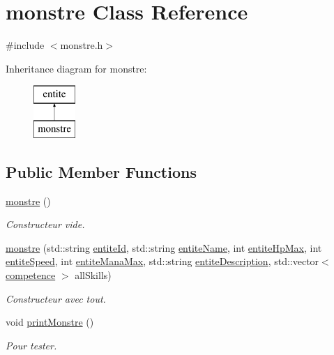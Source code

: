 \hypertarget{classmonstre}{}\section{monstre Class Reference}
\label{classmonstre}


{\ttfamily \#include $<$monstre.\+h$>$}

Inheritance diagram for monstre\+:\begin{figure}[H]
\begin{center}
\leavevmode
\includegraphics[height=2.000000cm]{classmonstre}
\end{center}
\end{figure}
\subsection*{Public Member Functions}
\begin{DoxyCompactItemize}
\item 
\hyperlink{classmonstre_a718cb1c5f9297f00e42e6b884ca85d6d}{monstre} ()
\begin{DoxyCompactList}\small\item\em Constructeur vide. \end{DoxyCompactList}\item 
\hyperlink{classmonstre_a863d9f9a553a2e3a49d16182dd004da8}{monstre} (std\+::string \hyperlink{classentite_a904e8783de9fe2fc4306bf6b7822d025}{entite\+Id}, std\+::string \hyperlink{classentite_abe631a515b1cd0866dcfb078c4ceb07a}{entite\+Name}, int \hyperlink{classentite_a754557f56c1c1fcbcbd40eec68b60f65}{entite\+Hp\+Max}, int \hyperlink{classentite_ad9df70a9bb07f07b3ebf520941c3a35f}{entite\+Speed}, int \hyperlink{classentite_a696167d32c27b3b2a2fa6b473a888b18}{entite\+Mana\+Max}, std\+::string \hyperlink{classentite_a6fab1d9a04ade2cb97ec0904b12c82c9}{entite\+Description}, std\+::vector$<$ \hyperlink{classcompetence}{competence} $>$ all\+Skills)
\begin{DoxyCompactList}\small\item\em Constructeur avec tout. \end{DoxyCompactList}\item 
void \hyperlink{classmonstre_aeb60395664bbca7846e037b058b5c716}{print\+Monstre} ()
\begin{DoxyCompactList}\small\item\em Pour tester. \end{DoxyCompactList}\end{DoxyCompactItemize}
